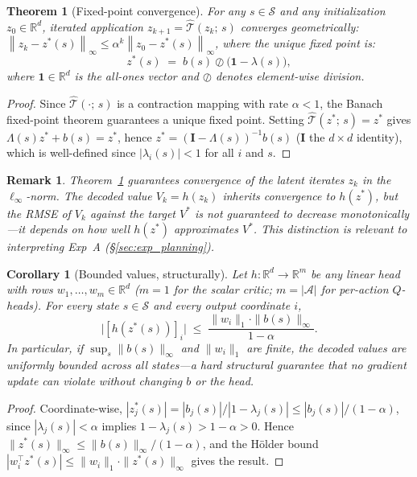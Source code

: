 \documentclass{article}
\newtheorem{theorem}{Theorem}
\newtheorem{corollary}{Corollary}
\newtheorem{remark}{Remark}
\newcommand{\R}{\mathbb{R}}
\newcommand{\cT}{\hat{\mathcal{T}}}          %
\newcommand{\zstar}{z^*}                     %
\newcommand{\spb}{\alpha}                    %
\newcommand{\eigs}{\lambda}                  %
\newcommand{\norm}[1]{\left\|#1\right\|}
\begin{document}
\begin{theorem}[Fixed-point convergence]
\label{thm:fp}
For any $s \in \mathcal{S}$ and any initialization $z_0 \in \R^d$, iterated
application $z_{k+1} = \cT(z_k;\, s)$ converges geometrically:
$\norm{z_k - \zstar(s)}_\infty \leq \spb^k \norm{z_0 - \zstar(s)}_\infty$,
where the unique fixed point is:
\begin{equation}
  \zstar(s) \;=\; b(s) \oslash \bigl(\mathbf{1} - \eigs(s)\bigr),
  \label{eq:fixedpoint}
\end{equation}
where $\mathbf{1} \in \R^d$ is the all-ones vector and $\oslash$ denotes
element-wise division.
\end{theorem}
\begin{proof}
  Since $\cT(\cdot;\,s)$ is a contraction mapping with rate $\spb < 1$, the
  Banach fixed-point theorem guarantees a unique fixed point.
  Setting $\cT(\zstar;\,s) = \zstar$ gives $\Lambda(s)\zstar + b(s) = \zstar$,
  hence $\zstar = (\mathbf{I} - \Lambda(s))^{-1}b(s)$ ($\mathbf{I}$ the
  $d\times d$ identity), which is well-defined since $|\eigs_i(s)| < 1$
  for all $i$ and $s$.
\end{proof}

\begin{remark}
\label{rem:zspace}
Theorem~\ref{thm:fp} guarantees convergence of the latent iterates $z_k$ in the
$\ell_\infty$-norm.
The decoded value $V_k = h(z_k)$ inherits convergence to $h(\zstar)$, but the
RMSE of $V_k$ against the target $V^*$ is not guaranteed to decrease
monotonically---it depends on how well $h(\zstar)$ approximates $V^*$.
This distinction is relevant to interpreting Exp~A (\S\ref{sec:exp_planning}).
\end{remark}

\begin{corollary}[Bounded values, structurally]
\label{cor:bounded}
Let $h: \R^d \to \R^m$ be any linear head with rows $w_1,\ldots,w_m \in \R^d$
($m=1$ for the scalar critic; $m=|\mathcal{A}|$ for per-action $Q$-heads).
For every state $s \in \mathcal{S}$ and every output coordinate $i$,
\[
  \bigl|[h(\zstar(s))]_i\bigr| \;\leq\; \frac{\|w_i\|_1 \cdot \|b(s)\|_\infty}{1 - \spb}.
\]
In particular, if $\sup_{s} \|b(s)\|_\infty$ and $\|w_i\|_1$ are finite, the
decoded values are uniformly bounded across all states---a hard structural
guarantee that no gradient update can violate without changing $b$ or the
head.
\end{corollary}
\begin{proof}
Coordinate-wise, $|\zstar_j(s)| = |b_j(s)| / |1 - \eigs_j(s)| \leq
|b_j(s)| / (1 - \spb)$, since $|\eigs_j(s)| < \spb$ implies
$1 - \eigs_j(s) > 1 - \spb > 0$.
Hence $\|\zstar(s)\|_\infty \leq \|b(s)\|_\infty / (1 - \spb)$, and the
H{\"o}lder bound $|w_i^\top \zstar(s)| \leq \|w_i\|_1 \cdot \|\zstar(s)\|_\infty$
gives the result.
\end{proof}
\end{document}
